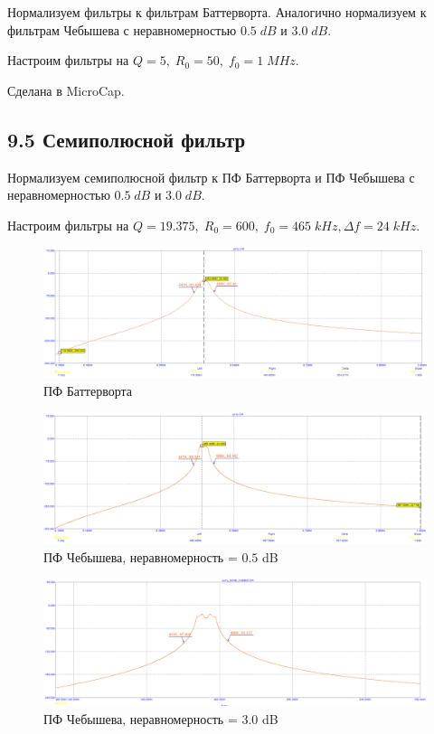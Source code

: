 \documentclass[12pt,a4paper]{article}
\begin{document}
	Нормализуем фильтры к фильтрам Баттерворта. Аналогично нормализуем к фильтрам Чебышева с неравномерностью $0.5 \; dB$ и $3.0 \; dB$.
	
	Настроим фильтры на $Q = 5, \; R_0 = 50, \; f_0 = 1 \; MHz$.
	
	Сделана в MicroCap.
	
	
	\subsection*{9.5 Семиполюсной фильтр}

	Нормализуем семиполюсной фильтр к ПФ Баттерворта и ПФ Чебышева с неравномерностью $0.5 \; dB$ и $3.0 \; dB$.

	Настроим фильтры на $Q = 19.375, \; R_0 = 600, \; f_0 = 465 \; kHz, \Delta f = 24 \; kHz$.

	\begin{figure}[H]
		\centering
		\includegraphics[width=1.0\linewidth]{res/pb7p_batt.png}
		\caption{ПФ Баттерворта}
		\label{phase}
	\end{figure}
	
	\begin{figure}[H]
		\centering
		\includegraphics[width=1.0\linewidth]{res/pb7p_cheb05.png}
		\caption{ПФ Чебышева, неравномерность = $0.5$ dB}
		\label{phase}
	\end{figure}
	
	
	\begin{figure}[H]
		\centering
		\includegraphics[width=1.0\linewidth]{res/pb7p_cheb3.png}
		\caption{ПФ Чебышева, неравномерность = $3.0$ dB}
		\label{phase}
	\end{figure}
		
\end{document}
